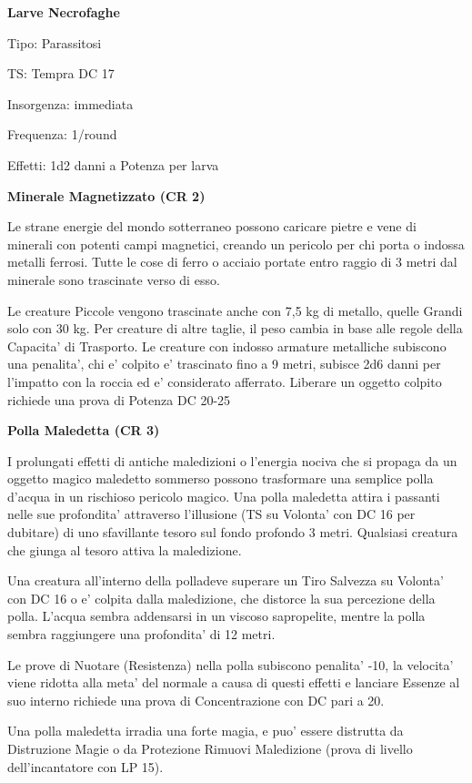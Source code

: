 \documentclass[a4paper,11pt,twoside,openany]{book}
\begin{document}
{		\textbf{Larve Necrofaghe}
		
		Tipo: Parassitosi
		
		TS: Tempra DC 17
		
		Insorgenza: immediata
		
		Frequenza: 1/round
		
		Effetti: 1d2 danni a Potenza per larva
		
		\textbf{Minerale Magnetizzato (CR 2)}
		
		Le strane energie del mondo sotterraneo possono caricare pietre e vene di minerali con potenti campi magnetici, creando un pericolo per chi porta o indossa metalli ferrosi. Tutte le cose di ferro o acciaio portate entro raggio di 3 metri dal minerale sono trascinate verso di esso.
		
		Le creature Piccole vengono trascinate anche con 7,5 kg di metallo, quelle Grandi solo con 30 kg. Per creature di altre taglie, il peso cambia in base alle regole della Capacita' di Trasporto. Le creature con indosso armature metalliche subiscono una penalita', chi e' colpito e' trascinato fino a 9 metri, subisce 2d6 danni per l'impatto con la roccia ed e' considerato afferrato. Liberare un oggetto colpito richiede una prova di Potenza DC 20-25
		
		\textbf{Polla Maledetta (CR 3)}
		
		I prolungati effetti di antiche maledizioni o l'energia nociva che si propaga da un oggetto magico maledetto sommerso possono trasformare una semplice polla d'acqua in un rischioso pericolo magico. Una polla maledetta attira i passanti nelle sue profondita' attraverso l'illusione (TS su Volonta' con DC 16 per dubitare) di uno sfavillante tesoro sul fondo profondo 3 metri. Qualsiasi creatura che giunga al tesoro attiva la maledizione.
		
		Una creatura all'interno della polladeve superare un Tiro Salvezza su Volonta' con DC 16 o e' colpita dalla maledizione, che distorce la sua percezione della polla. L'acqua sembra addensarsi in un viscoso sapropelite, mentre la polla sembra raggiungere una profondita' di 12 metri.
		
		Le prove di Nuotare (Resistenza) nella polla subiscono penalita' -10, la velocita' viene ridotta alla meta' del normale a causa di questi effetti e lanciare Essenze al suo interno richiede una prova di Concentrazione con DC pari a 20.
		
		Una polla maledetta irradia una forte magia, e puo' essere distrutta da Distruzione Magie o da Protezione Rimuovi Maledizione (prova di livello dell'incantatore
		con LP 15).
		
}
\end{document}
